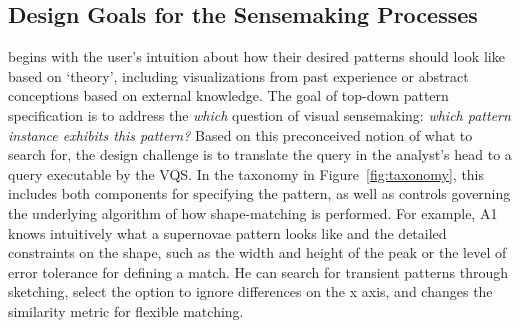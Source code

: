 \subsection{Design Goals for the Sensemaking Processes}
 begins with the user's intuition 
about how their desired patterns should look like based on `theory', including visualizations from past experience or abstract conceptions based on external knowledge. The goal of top-down pattern specification is to address the \textit{which} question of visual sensemaking: \textit{which pattern instance exhibits this pattern?}%
Based on this preconceived notion of what to search for, 
the design challenge is to translate the query in the 
analyst's head to a query executable by the VQS. 
In the taxonomy in Figure~\ref{fig:taxonomy}, 
this includes both components for specifying the pattern, 
as well as controls governing the underlying 
algorithm of how shape-matching is performed. 
For example, A1 knows intuitively 
what a supernovae pattern looks like 
and the detailed constraints on the shape, 
such as the width and height of the peak 
or the level of error tolerance for defining a match. 
He can search for transient patterns through sketching, 
select the option to ignore differences 
on the x axis, and changes the similarity metric for flexible matching.  %
